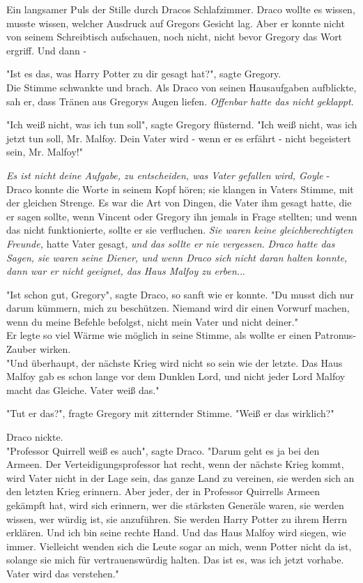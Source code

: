 {Ein langsamer Puls der Stille durch Dracos Schlafzimmer. Draco wollte es wissen, musste wissen, welcher Ausdruck auf Gregors Gesicht lag. Aber er konnte nicht von seinem Schreibtisch aufschauen, noch nicht, nicht bevor Gregory das Wort ergriff. Und dann -

"Ist es das, was Harry Potter zu dir gesagt hat?", sagte Gregory.\\ Die Stimme schwankte und brach. Als Draco von seinen Hausaufgaben aufblickte, sah er, dass Tränen aus Gregorys Augen liefen. \emph{Offenbar hatte das nicht geklappt}.

"Ich weiß nicht, was ich tun soll", sagte Gregory flüsternd. "Ich weiß nicht, was ich jetzt tun soll, Mr. Malfoy. Dein Vater wird - wenn er es erfährt - nicht begeistert sein, Mr. Malfoy!"

\emph{Es ist nicht deine Aufgabe, zu entscheiden, was Vater gefallen wird, Goyle} - Draco konnte die Worte in seinem Kopf hören; sie klangen in Vaters Stimme, mit der gleichen Strenge. Es war die Art von Dingen, die Vater ihm gesagt hatte, die er sagen sollte, wenn Vincent oder Gregory ihn jemals in Frage stellten; und wenn das nicht funktionierte, sollte er sie verfluchen. \emph{Sie waren keine gleichberechtigten Freunde,} hatte Vater gesagt, \emph{und das sollte er nie vergessen.} \emph{Draco hatte das Sagen, sie waren seine Diener, und wenn Draco sich nicht daran halten konnte, dann war er nicht geeignet, das Haus Malfoy zu erben.}..

"Ist schon gut, Gregory", sagte Draco, so sanft wie er konnte. "Du musst dich nur darum kümmern, mich zu beschützen. Niemand wird dir einen Vorwurf machen, wenn du meine Befehle befolgst, nicht mein Vater und nicht deiner."\\ Er legte so viel Wärme wie möglich in seine Stimme, als wollte er einen Patronus-Zauber wirken.\\ "Und überhaupt, der nächste Krieg wird nicht so sein wie der letzte. Das Haus Malfoy gab es schon lange vor dem Dunklen Lord, und nicht jeder Lord Malfoy macht das Gleiche. Vater weiß das."

"Tut er das?", fragte Gregory mit zitternder Stimme. "Weiß er das wirklich?"

Draco nickte.\\ "Professor Quirrell weiß es auch", sagte Draco. "Darum geht es ja bei den Armeen. Der Verteidigungsprofessor hat recht, wenn der nächste Krieg kommt, wird Vater nicht in der Lage sein, das ganze Land zu vereinen, sie werden sich an den letzten Krieg erinnern. Aber jeder, der in Professor Quirrells Armeen gekämpft hat, wird sich erinnern, wer die stärksten Generäle waren, sie werden wissen, wer würdig ist, sie anzuführen. Sie werden Harry Potter zu ihrem Herrn erklären. Und ich bin seine rechte Hand. Und das Haus Malfoy wird siegen, wie immer. Vielleicht wenden sich die Leute sogar an mich, wenn Potter nicht da ist, solange sie mich für vertrauenswürdig halten. Das ist es, was ich jetzt vorhabe. Vater wird das verstehen."

}
